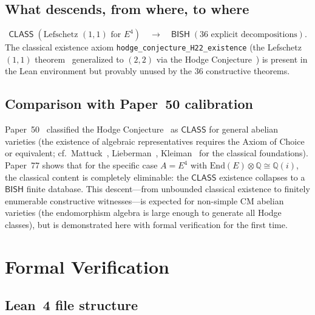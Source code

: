 \documentclass[11pt]{article}
\theoremstyle{plain}
\theoremstyle{definition}
\theoremstyle{remark}
\newcommand{\Q}{\mathbb{Q}}
\newcommand{\End}{\mathrm{End}}
\newcommand{\BISH}{\mathsf{BISH}}
\newcommand{\CLASS}{\mathsf{CLASS}}
\begin{document}
\subsection{What descends, from where, to where}

\[
  \CLASS \;(\text{Lefschetz $(1,1)$ for } E^4)
  \quad\longrightarrow\quad
  \BISH \;(\text{36 explicit decompositions}).
\]
The classical existence axiom \texttt{hodge\_conjecture\_H22\_existence}
(the Lefschetz~$(1,1)$ theorem~\cite{Lefschetz1924} generalized to
$(2,2)$ via the Hodge Conjecture~\cite{Hodge1950})
is present in the Lean environment but provably unused by the
36 constructive theorems.

\subsection{Comparison with Paper~50 calibration}

Paper~50~\cite{Paper50} classified the Hodge
Conjecture~\cite{Hodge1950,Grothendieck1969} as
$\CLASS$ for general abelian varieties (the existence of algebraic
representatives requires the Axiom of Choice or equivalent;
cf.~Mattuck~\cite{Mattuck1958}, Lieberman~\cite{Lieberman1968},
Kleiman~\cite{Kleiman1968} for the classical foundations).
Paper~77 shows that for the specific case $A = E^4$ with
$\End(E) \otimes \Q \cong \Q(i)$, the classical content is
completely eliminable: the $\CLASS$ existence collapses to a
$\BISH$ finite database.  This descent---from unbounded classical
existence to finitely enumerable constructive witnesses---is
expected for non-simple CM abelian varieties (the endomorphism
algebra is large enough to generate all Hodge classes), but is
demonstrated here with formal verification for the first time.

\section{Formal Verification}\label{sec:formal}

\subsection{Lean~4 file structure}
\end{document}
